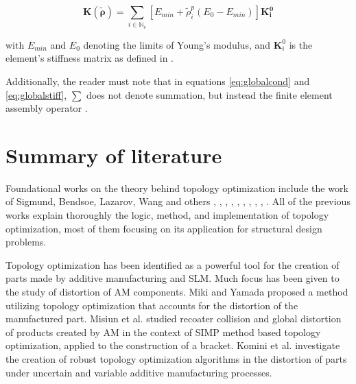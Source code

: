 \documentclass[../main.tex]{subfiles}
\begin{document}
\begin{equation}
  \bm{K}(\bm{\tilde{\rho}}) = \sum_{i \in \mathbb{N}_e}[E_{min} + \tilde{\rho}_i^p(E_0 - E_{min})]\bm{K_i^0}
\label{eq:globalstiff}
\end{equation}

with $E_{min}$ and $E_0$ denoting the limits of Young's modulus, and $\bm{K}_i^0$ is the element's stiffness matrix as defined in \cite{liuEfficient3DTopology2014}.

Additionally, the reader must note that in equations \ref{eq:globalcond} and \ref{eq:globalstiff}, $\sum$ does not denote summation, but instead the finite element assembly operator \cite{hornbergerFiniteElementMethod2005}. 

\section{Summary of literature}

Foundational works on the theory behind topology optimization include the work of Sigmund, Bendsoe, Lazarov, Wang and others \cite{bendsoeGeneratingOptimalTopologies1988}, \cite{bendsoeOptimalShapeDesign1989}, \cite{bendsoeOptimizationStructuralTopology1995}, \cite{bendsoeMaterialInterpolationSchemes1999}, \cite{bendsoeTopologyOptimization2002}, \cite{groenHomogenizationbasedTopologyOptimization2018}, \cite{lazarovFiltersTopologyOptimization2011}, \cite{wangProjectionMethodsConvergence2011a}, \cite{allaireShapeOptimizationHomogenization2002}, \cite{allaireHomogenizationMethodTopology2019}. All of the previous works explain thoroughly the logic, method, and implementation of topology optimization, most of them focusing on its application for structural design problems. 

Topology optimization has been identified as a powerful tool for the creation of parts made by additive manufacturing and SLM. Much focus has been given to the study of distortion of AM components. Miki and Yamada \cite{mikiTopologyOptimizationConsidering2021} proposed a method utilizing topology optimization that accounts for the distortion of the manufactured part. Misiun et al. \cite{misiunTopologyOptimizationAdditive2021} studied recoater collision and global distortion of products created by AM in the context of SIMP method based topology optimization, applied to the construction of a bracket. Komini et al. \cite{kominiRobustTopologyOptimization2023} investigate the creation of robust topology optimization algorithms in the distortion of parts under uncertain and variable additive manufacturing processes.
\end{document}
